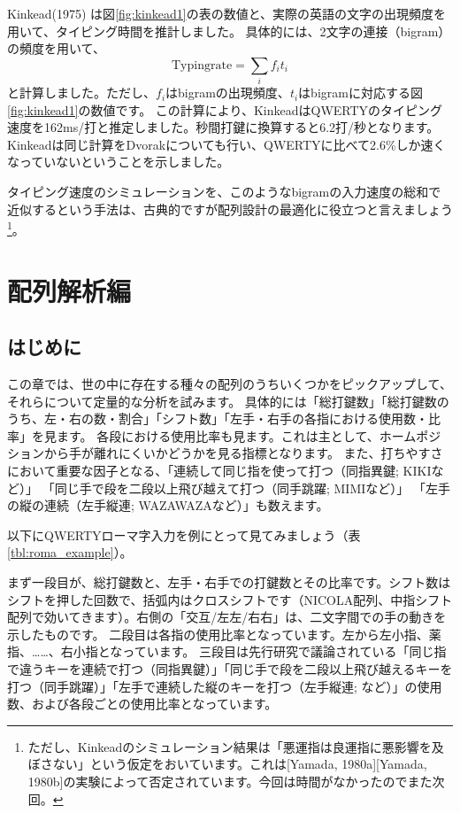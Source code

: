 Kinkead(1975) は図\ref{fig:kinkead1}の表の数値と、実際の英語の文字の出現頻度を用いて、タイピング時間を推計しました。
具体的には、2文字の連接（bigram）の頻度を用いて、
\[
  \mathrm{Typing rate} = \sum_i f_i t_i
\]
と計算しました。ただし、$f_i$はbigramの出現頻度、$t_i$はbigramに対応する図\ref{fig:kinkead1}の数値です。
この計算により、KinkeadはQWERTYのタイピング速度を162ms/打と推定しました。秒間打鍵に換算すると6.2打/秒となります。
Kinkeadは同じ計算をDvorakについても行い、QWERTYに比べて2.6\%しか速くなっていないということを示しました。

タイピング速度のシミュレーションを、このようなbigramの入力速度の総和で近似するという手法は、古典的ですが配列設計の最適化に役立つと言えましょう\footnote{ただし、Kinkeadのシミュレーション結果は「悪運指は良運指に悪影響を及ぼさない」という仮定をおいています。これは[Yamada, 1980a][Yamada, 1980b]の実験によって否定されています。今回は時間がなかったのでまた次回。}。

\section{配列解析編}

\subsection{はじめに}

この章では、世の中に存在する種々の配列のうちいくつかをピックアップして、それらについて定量的な分析を試みます。
具体的には「総打鍵数」「総打鍵数のうち、左・右の数・割合」「シフト数」「左手・右手の各指における使用数・比率」を見ます。
各段における使用比率も見ます。これは主として、ホームポジションから手が離れにくいかどうかを見る指標となります。
また、打ちやすさにおいて重要な因子となる、「連続して同じ指を使って打つ（同指異鍵; KIKIなど）」
「同じ手で段を二段以上飛び越えて打つ（同手跳躍; MIMIなど）」
「左手の縦の連続（左手縦連; WAZAWAZAなど）」も数えます。

以下にQWERTYローマ字入力を例にとって見てみましょう（表\ref{tbl:roma_example}）。

まず一段目が、総打鍵数と、左手・右手での打鍵数とその比率です。シフト数はシフトを押した回数で、括弧内はクロスシフトです（NICOLA配列、中指シフト配列で効いてきます）。右側の「交互/左左/右右」は、二文字間での手の動きを示したものです。
二段目は各指の使用比率となっています。左から左小指、薬指、……、右小指となっています。
三段目は先行研究で議論されている「同じ指で違うキーを連続で打つ（同指異鍵）」「同じ手で段を二段以上飛び越えるキーを打つ（同手跳躍）」「左手で連続した縦のキーを打つ（左手縦連; など）」の使用数、および各段ごとの使用比率となっています。


